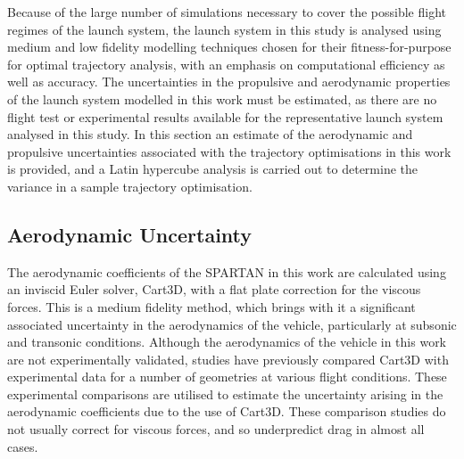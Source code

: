 Because of the large number of simulations necessary to cover the possible flight regimes of the launch system, the launch system in this study is analysed using medium and low fidelity modelling techniques chosen for their fitness-for-purpose for optimal trajectory analysis, with an emphasis on computational efficiency as well as accuracy.
The uncertainties in the propulsive and aerodynamic properties of the launch system modelled in this work must be estimated, as there are no flight test or experimental results available for the representative launch system analysed in this study. In this section an estimate of the aerodynamic and propulsive uncertainties associated with the trajectory optimisations in this work is provided, and a Latin hypercube analysis is carried out to determine the variance in a sample trajectory optimisation. 

\subsection{Aerodynamic Uncertainty}\label{sec:aerounc}





The aerodynamic coefficients of the SPARTAN in this work are calculated using an inviscid Euler solver, Cart3D, with a flat plate correction for the viscous forces. This is a medium fidelity method, which brings with it a significant associated uncertainty in the aerodynamics of the vehicle, particularly at subsonic and transonic conditions. Although the aerodynamics of the vehicle in this work are not experimentally validated, studies have previously compared Cart3D with experimental data for a number of geometries at various flight conditions. These experimental comparisons are utilised to estimate the uncertainty arising in the aerodynamic coefficients due to the use of Cart3D. These comparison studies do not usually correct for viscous forces, and so underpredict drag in almost all cases.




